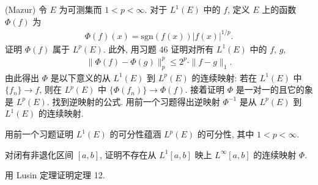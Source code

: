 \documentclass[../../main.tex]{subfiles}
\begin{document}
\begin{exercise}\label{exercise:ch07-48}
(Mazur) 令 $E$ 为可测集而 $1<p<\infty$. 对于 $L^{1}(E)$ 中的 $f$, 定义 $E$ 上的函数 $\Phi(f)$ 为
\begin{align*}
\Phi(f)(x)=\mathrm{sgn}(f(x))|f(x)|^{1/p}.
\end{align*}
证明 $\Phi(f)$ 属于 $L^{p}(E)$. 此外, 用习题 46 证明对所有 $L^{1}(E)$ 中的 $f$, $g$,
\begin{align*}
\|\Phi(f)-\Phi(g)\|_{p}^{p}\leqslant 2^{p}\cdot\|f-g\|_{1}.
\end{align*}
由此得出 $\Phi$ 是以下意义的从 $L^{1}(E)$ 到 $L^{p}(E)$ 的连续映射: 若在 $L^{1}(E)$ 中 $\{f_{n}\}\to f$, 则在 $L^{p}(E)$ 中 $\{\Phi(f_{n})\}\to\Phi(f)$. 接着证明 $\Phi$ 是一对一的且它的象是 $L^{p}(E)$. 找到逆映射的公式. 用前一个习题得出逆映射 $\Phi^{-1}$ 是从 $L^{p}(E)$ 到 $L^{1}(E)$ 的连续映射.
\end{exercise}

\begin{exercise}\label{exercise:ch07-49}
用前一个习题证明 $L^{1}(E)$ 的可分性蕴涵 $L^{p}(E)$ 的可分性, 其中 $1<p<\infty$.
\end{exercise}

\begin{exercise}\label{exercise:ch07-50}
对闭有非退化区间 $[a,b]$, 证明不存在从 $L^{1}[a,b]$ 映上 $L^{\infty}[a,b]$ 的连续映射 $\Phi$.
\end{exercise}

\begin{exercise}\label{exercise:ch07-51}
用 Lusin 定理证明定理 12.
\end{exercise}
\end{document}
